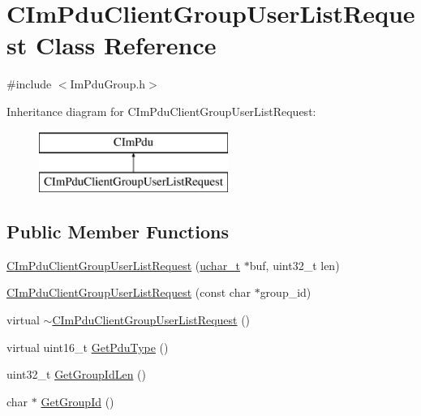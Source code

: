 \hypertarget{class_c_im_pdu_client_group_user_list_request}{}\section{C\+Im\+Pdu\+Client\+Group\+User\+List\+Request Class Reference}
\label{class_c_im_pdu_client_group_user_list_request}


{\ttfamily \#include $<$Im\+Pdu\+Group.\+h$>$}

Inheritance diagram for C\+Im\+Pdu\+Client\+Group\+User\+List\+Request\+:\begin{figure}[H]
\begin{center}
\leavevmode
\includegraphics[height=2.000000cm]{class_c_im_pdu_client_group_user_list_request}
\end{center}
\end{figure}
\subsection*{Public Member Functions}
\begin{DoxyCompactItemize}
\item 
\hyperlink{class_c_im_pdu_client_group_user_list_request_a01a9e4b40158bb42c1d128fc55e554d4}{C\+Im\+Pdu\+Client\+Group\+User\+List\+Request} (\hyperlink{base_2ostype_8h_a124ea0f8f4a23a0a286b5582137f0b8d}{uchar\+\_\+t} $\ast$buf, uint32\+\_\+t len)
\item 
\hyperlink{class_c_im_pdu_client_group_user_list_request_a1eb8d9b0f67e4b6d9f3c88d1e8269ef4}{C\+Im\+Pdu\+Client\+Group\+User\+List\+Request} (const char $\ast$group\+\_\+id)
\item 
virtual \hyperlink{class_c_im_pdu_client_group_user_list_request_aec22c6c35ad76ba017c4522ddb7f6e97}{$\sim$\+C\+Im\+Pdu\+Client\+Group\+User\+List\+Request} ()
\item 
virtual uint16\+\_\+t \hyperlink{class_c_im_pdu_client_group_user_list_request_a127073f42e997b4b49169fc355774541}{Get\+Pdu\+Type} ()
\item 
uint32\+\_\+t \hyperlink{class_c_im_pdu_client_group_user_list_request_a1e7b373ebbf0453cc47ad7e582642224}{Get\+Group\+Id\+Len} ()
\item 
char $\ast$ \hyperlink{class_c_im_pdu_client_group_user_list_request_af6a2a9585cc56c6cc7ba4929169466ad}{Get\+Group\+Id} ()
\end{DoxyCompactItemize}
